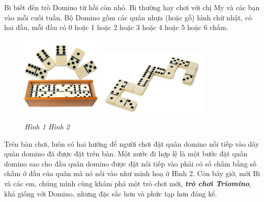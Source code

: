 	Bi biết đến trò Domino từ hồi còn nhỏ. Bi thường hay chơi với chị My và các bạn vào mỗi cuối tuần.
	Bộ Domino gồm các quân nhựa (hoặc gỗ) hình chữ nhật, có hai đầu, mỗi đầu có 0 hoặc 1 hoặc 2 hoặc
	3 hoặc 4 hoặc 5 hoặc 6 chấm.
	\begin{figure}[H]
	\centering
	\vspace*{-10pt}
	\captionsetup{labelformat=empty, justification=centering}
	\includegraphics[width=0.34\textwidth]{dom-01}
	\includegraphics[width=0.48\textwidth]{dom-02}
	\caption{\textit{\small Hình 1 \hspace{110pt}Hình 2}}
	\vspace*{-15pt}
	\end{figure}
	Trên bàn chơi, luôn có hai hướng để người chơi đặt quân domino nối tiếp vào dãy quân domino đã
	được đặt trên bàn. Một nước đi hợp lệ là một bước đặt quân domino sao cho đầu quân domino được
	đặt nối tiếp vào phải có số chấm bằng số chấm ở đầu của quân mà nó nối vào như minh hoạ ở Hình 2.%
	Còn bây giờ, mời Bi và các em, chúng mình cùng khám phá một trò chơi mới, \textit{\textbf{trò chơi Triomino}}, khá
	giống với Domino, nhưng đặc sắc hơn và phức tạp hơn đáng kể.
